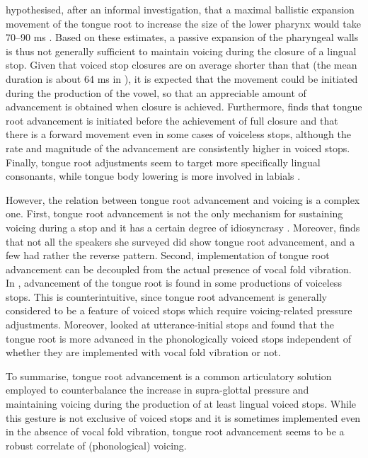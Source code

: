 \documentclass[preprint]{JASAnew}
\begin{document}
\citet{rothenberg1967} hypothesised, after an informal investigation,
that a maximal ballistic expansion movement of the tongue root to
increase the size of the lower pharynx would take 70--90 ms
\citep[99]{rothenberg1967}. Based on these estimates, a passive
expansion of the pharyngeal walls is thus not generally sufficient to
maintain voicing during the closure of a lingual stop. Given that voiced
stop closures are on average shorter than that (the mean duration is
about 64 ms in \citealt{luce1985}), it is expected that the movement
could be initiated during the production of the vowel, so that an
appreciable amount of advancement is obtained when closure is achieved.
Furthermore, \citet{westbury1983} finds that tongue root advancement is
initiated before the achievement of full closure and that there is a
forward movement even in some cases of voiceless stops, although the
rate and magnitude of the advancement are consistently higher in voiced
stops. Finally, tongue root adjustments seem to target more specifically
lingual consonants, while tongue body lowering is more involved in
labials \citep{perkell1969, westbury1983, vazquez-alvarez2007}.

However, the relation between tongue root advancement and voicing is a
complex one. First, tongue root advancement is not the only mechanism
for sustaining voicing during a stop
\citep{rothenberg1967, westbury1983, ohala2011} and it has a certain
degree of idiosyncrasy \citep{ahn2018}. Moreover, \citet{ahn2018} finds
that not all the speakers she surveyed did show tongue root advancement,
and a few had rather the reverse pattern. Second, implementation of
tongue root advancement can be decoupled from the actual presence of
vocal fold vibration. In \citet{westbury1983}, advancement of the tongue
root is found in some productions of voiceless stops. This is
counterintuitive, since tongue root advancement is generally considered
to be a feature of voiced stops which require voicing-related pressure
adjustments. Moreover, \citet{ahn2015, ahn2018} looked at
utterance-initial stops and found that the tongue root is more advanced
in the phonologically voiced stops independent of whether they are
implemented with vocal fold vibration or not.

To summarise, tongue root advancement is a common articulatory solution
employed to counterbalance the increase in supra-glottal pressure and
maintaining voicing during the production of at least lingual voiced
stops. While this gesture is not exclusive of voiced stops and it is
sometimes implemented even in the absence of vocal fold vibration,
tongue root advancement seems to be a robust correlate of (phonological)
voicing.
\end{document}

